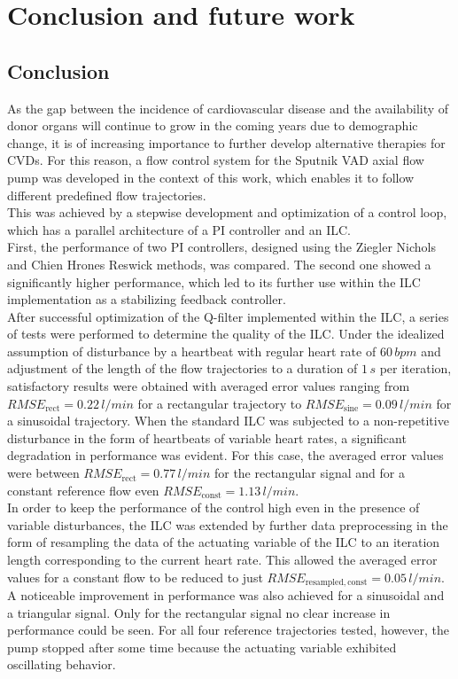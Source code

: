 \chapter{Conclusion and future work}
\section{Conclusion}
As the gap between the incidence of cardiovascular disease and the availability of donor organs will continue to grow in the coming years due to demographic change, it is of increasing importance to further develop alternative therapies for CVDs.
For this reason, a flow control system for the Sputnik VAD axial flow pump was developed in the context of this work, which enables it to follow different predefined flow trajectories.
\\This was achieved by a stepwise development and optimization of a control loop, which has a parallel architecture of a PI controller and an ILC.
\\First, the performance of two PI controllers, designed using the Ziegler Nichols and Chien Hrones Reswick methods, was compared. The second one showed a significantly higher performance, which led to its further use within the ILC implementation as a stabilizing feedback controller.
\\After successful optimization of the Q-filter implemented within the ILC, a series of tests were performed to determine the quality of the ILC. Under the idealized assumption of disturbance by a heartbeat with regular heart rate of $60\, bpm$ and adjustment of the length of the flow trajectories to a duration of $1\,s$ per iteration, satisfactory results were obtained with averaged error values ranging from $RMSE_{\mathrm{rect}}=0.22\,l/min$ for a rectangular trajectory to $RMSE_{\mathrm{sine}}=0.09\,l/min$ for a sinusoidal trajectory. When the standard ILC was subjected to a non-repetitive disturbance in the form of heartbeats of variable heart rates, a significant degradation in performance was evident. For this case, the averaged error values were between $RMSE_{\mathrm{rect}}=0.77\,l/min$ for the rectangular signal and for a constant reference flow even $RMSE_{\mathrm{const}}=1.13\, l/min$.
\\In order to keep the performance of the control high even in the presence of variable disturbances, the ILC was extended by further data preprocessing in the form of resampling the data of the actuating variable of the ILC to an iteration length corresponding to the current heart rate. This allowed the averaged error values for a constant flow to be reduced to just $RMSE_{\mathrm{resampled,const}}=0.05\, l/min$. A noticeable improvement in performance was also achieved for a sinusoidal and a triangular signal. Only for the rectangular signal no clear increase in performance could be seen.
For all four reference trajectories tested, however, the pump stopped after some time because the actuating variable exhibited oscillating behavior.

